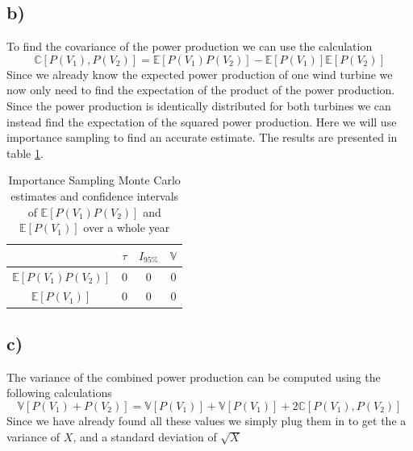 \documentclass[a4paper]{article}
\begin{document}
\subsection*{b)}
To find the covariance of the power production we can use the calculation
\begin{equation}
     \mathbb{C}[P(V_1), P(V_2)] = \mathbb{E}[P(V_1)P(V_2)] - \mathbb{E}[P(V_1)]\mathbb{E}[P(V_2)]
\end{equation}
Since we already know the expected power production of one wind turbine we now only need to find the expectation of the product of the power production. Since the power production is identically distributed for both turbines we can instead find the expectation of the squared power production. Here we will use importance sampling to find an accurate estimate. The results are presented in table \ref{tab:Covresults}.

\begin{table}[H]
    \centering
    \caption{Importance Sampling Monte Carlo estimates and confidence intervals of $\mathbb{E}[P(V_1)P(V_2)]$ and $\mathbb{E}[P(V_1)]$ over a whole year}
    \label{tab:Covresults}
    \begin{tabular}{|c|| c c c ||}
        \hline
        & $\tau$ & $I_{95\%}$ & $\mathbb{V}$ \\
        \hline\hline
        $\mathbb{E}[P(V_1)P(V_2)]$ & 0 & 0 & 0 \\
        \hline
        $\mathbb{E}[P(V_1)]$ & 0 & 0 & 0 \\
        \hline
    \end{tabular}
\end{table}

\subsection*{c)}
The variance of the combined power production can be computed using the following calculations
\begin{equation}
    \mathbb{V}[P(V_1) + P(V_2)] = \mathbb{V}[P(V_1)] + \mathbb{V}[P(V_1)] + 2\mathbb{C}[P(V_1), P(V_2)]
\end{equation}
Since we have already found all these values we simply plug them in to get the a variance of $X$, and a standard deviation of $\sqrt{X}$
\end{document}
